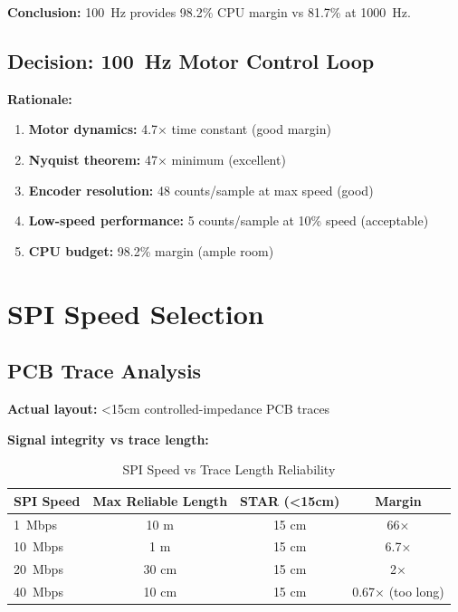 \documentclass[12pt,letterpaper]{article}
\begin{document}
\textbf{Conclusion:} 100~Hz provides 98.2\% CPU margin vs 81.7\% at 1000~Hz.

\subsection{Decision: 100~Hz Motor Control Loop}

\textbf{Rationale:}
\begin{enumerate}
    \item \textbf{Motor dynamics:} 4.7× time constant (good margin)
    \item \textbf{Nyquist theorem:} 47× minimum (excellent)
    \item \textbf{Encoder resolution:} 48 counts/sample at max speed (good)
    \item \textbf{Low-speed performance:} 5 counts/sample at 10\% speed (acceptable)
    \item \textbf{CPU budget:} 98.2\% margin (ample room)
\end{enumerate}

\section{SPI Speed Selection}

\subsection{PCB Trace Analysis}

\textbf{Actual layout:} <15cm controlled-impedance PCB traces

\textbf{Signal integrity vs trace length:}

\begin{table}[H]
\centering
\caption{SPI Speed vs Trace Length Reliability}
\begin{tabular}{lccc}
\toprule
\textbf{SPI Speed} & \textbf{Max Reliable Length} & \textbf{STAR (<15cm)} & \textbf{Margin} \\
\midrule
1~Mbps & 10 m & 15 cm & 66× \\
10~Mbps & 1 m & 15 cm & 6.7× \\
20~Mbps & 30 cm & 15 cm & 2× \\
40~Mbps & 10 cm & 15 cm & 0.67× (too long) \\
\bottomrule
\end{tabular}
\end{table}
\end{document}
